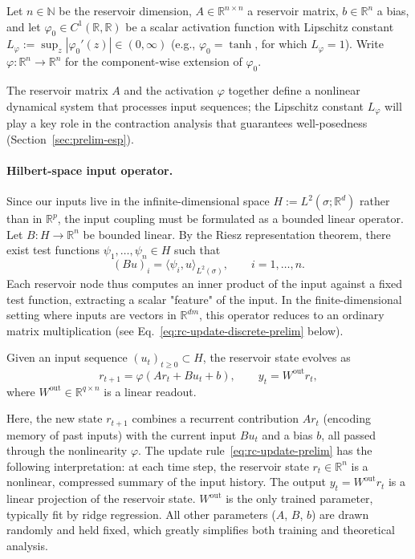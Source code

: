 \documentclass[11pt]{article}
\newcommand{\R}{\mathbb{R}}
\newcommand{\N}{\mathbb{N}}
\newcommand{\1}{\mathbf{1}}
\begin{document}
Let $n\in\N$ be the reservoir dimension, $A\in\R^{n\times n}$ a reservoir matrix, $b\in\R^n$ a bias, and let $\varphi_0\in C^1(\R,\R)$ be a scalar activation function with Lipschitz constant $L_\varphi:=\sup_z|\varphi_0'(z)|\in(0,\infty)$ (e.g., $\varphi_0=\tanh$, for which $L_\varphi=1$). Write $\varphi:\R^n\to\R^n$ for the component-wise extension of $\varphi_0$.

The reservoir matrix $A$ and the activation $\varphi$ together define a nonlinear dynamical system that processes input sequences; the Lipschitz constant $L_\varphi$ will play a key role in the contraction analysis that guarantees well-posedness (Section~\ref{sec:prelim-esp}).

\paragraph{Hilbert-space input operator.} Since our inputs live in the infinite-dimensional space $H:=L^2(\sigma;\R^d)$ rather than in $\R^p$, the input coupling must be formulated as a bounded linear operator. Let $B:H\to\R^n$ be bounded linear. By the Riesz representation theorem, there exist test functions
$\psi_1,\dots,\psi_n\in H$ such that
\begin{equation}\label{eq:riesz-prelim}
(Bu)_i=\langle \psi_i,u\rangle_{L^2(\sigma)},\qquad i=1,\dots,n.
\end{equation}
Each reservoir node thus computes an inner product of the input against a fixed test function, extracting a scalar "feature" of the input. In the finite-dimensional setting where inputs are vectors in $\R^{dm}$, this operator reduces to an ordinary matrix multiplication (see Eq.~\eqref{eq:rc-update-discrete-prelim} below). \\

\begin{definition}\label{def:esn-prelim}
Given an input sequence $(u_t)_{t\ge 0}\subset H$, the reservoir state evolves as
\begin{equation}\label{eq:rc-update-prelim}
r_{t+1}=\varphi(A r_t + B u_t + b),\qquad y_t=W^{\mathrm{out}}r_t,
\end{equation}
where $W^{\mathrm{out}}\in\R^{q\times n}$ is a linear readout.
\end{definition}

Here, the new state $r_{t+1}$ combines a recurrent contribution $Ar_t$ (encoding memory of past inputs) with the current input $Bu_t$ and a bias $b$, all passed through the nonlinearity $\varphi$. The update rule~\eqref{eq:rc-update-prelim} has the following interpretation: at each time step, the reservoir state $r_t\in\R^n$ is a nonlinear, compressed summary of the input history. The output $y_t=W^{\mathrm{out}}r_t$ is a linear projection of the reservoir state. $W^{\mathrm{out}}$ is the only trained parameter, typically fit by ridge regression.  All other parameters ($A$, $B$, $b$) are drawn randomly and held fixed, which greatly simplifies both training and theoretical analysis.
\end{document}
